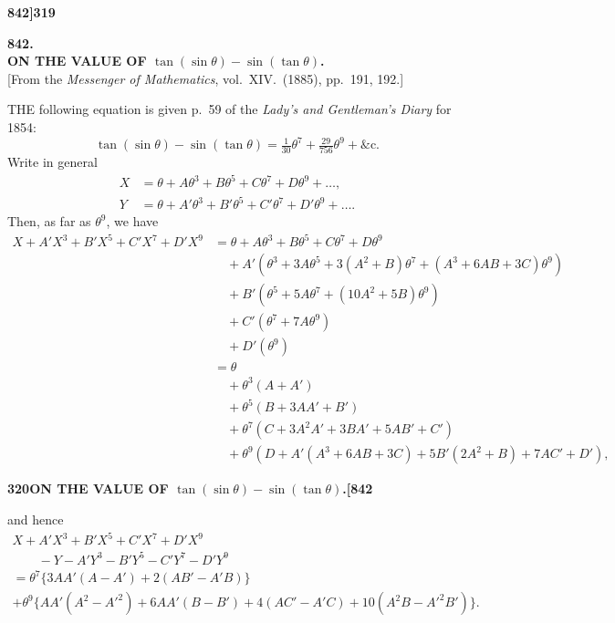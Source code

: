 \documentclass[12pt,a4paper]{article}
\theoremstyle{definition}
\begin{document}
\newpage
\setcounter{page}{319}

\noindent\textbf{842]}\hfill\textbf{319}

\bigskip

\begin{center}
{\Large\textbf{842.}}\\[1em]
{\large\textbf{ON THE VALUE OF $\tan(\sin\theta) - \sin(\tan\theta)$.}}\\[1em]
[From the \textit{Messenger of Mathematics}, vol.\ XIV.\ (1885), pp.\ 191, 192.]
\end{center}

\bigskip

\noindent THE following equation is given p.\ 59 of the \textit{Lady's and Gentleman's Diary} for 1854:
\[
\tan(\sin\theta) - \sin(\tan\theta) = \tfrac{1}{30}\theta^7 + \tfrac{29}{756}\theta^9 + \&\text{c.}
\]
Write in general
\begin{align*}
X &= \theta + A\theta^3 + B\theta^5 + C\theta^7 + D\theta^9 + \ldots, \\
Y &= \theta + A'\theta^3 + B'\theta^5 + C'\theta^7 + D'\theta^9 + \ldots.
\end{align*}
Then, as far as $\theta^9$, we have
\begin{align*}
X + A'X^3 + B'X^5 + C'X^7 + D'X^9 &= \theta + A\theta^3 + B\theta^5 + C\theta^7 + D\theta^9 \\
&\quad + A'(\theta^3 + 3A\theta^5 + 3(A^2 + B)\theta^7 + (A^3 + 6AB + 3C)\theta^9) \\
&\quad + B'(\theta^5 + 5A\theta^7 + (10A^2 + 5B)\theta^9) \\
&\quad + C'(\theta^7 + 7A\theta^9) \\
&\quad + D'(\theta^9) \\
&= \theta \\
&\quad + \theta^3(A + A') \\
&\quad + \theta^5(B + 3AA' + B') \\
&\quad + \theta^7(C + 3A^2A' + 3BA' + 5AB' + C') \\
&\quad + \theta^9(D + A'(A^3 + 6AB + 3C) + 5B'(2A^2 + B) + 7AC' + D'),
\end{align*}

\newpage
\setcounter{page}{320}

\noindent\textbf{320}\hfill\textbf{ON THE VALUE OF $\tan(\sin\theta) - \sin(\tan\theta)$.}\hfill\textbf{[842}

\bigskip

\noindent and hence
\begin{align*}
X + A'X^3 + B'X^5 + C'X^7 + D'X^9 &\\
\qquad - Y - A'Y^3 - B'Y^5 - C'Y^7 - D'Y^9 &\\
= \theta^7\{3AA'(A - A') + 2(AB' - A'B)\} &\\
+ \theta^9\{AA'(A^2 - A'^2) + 6AA'(B - B') + 4(AC' - A'C) + 10(A^2B - A'^2B')\}. &
\end{align*}
\end{document}

